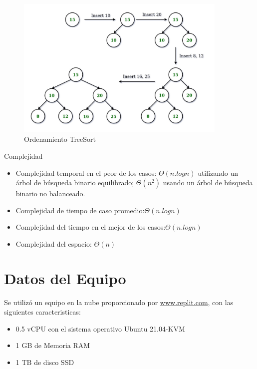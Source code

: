 \documentclass{article}
\begin{document}
\begin{figure}[H]
\centering
\includegraphics[width=0.9\textwidth]{img/treeejem.jpg}
\caption{Ordenamiento TreeSort}
\label{fig:QuickSort}
\end{figure}

\item Complejidad

 \begin{itemize}
          \item Complejidad temporal en el peor de los casos: $\Theta (n.log n)$  utilizando un árbol de búsqueda binario equilibrado; $\Theta (n^2)$ usando un árbol de búsqueda binario no balanceado.
           \item Complejidad de tiempo de caso promedio:$\Theta (n.log n)$
           \item Complejidad del tiempo en el mejor de los casos:$\Theta (n.log n)$
           \item Complejidad del espacio: $\Theta (n)$

\end{itemize}

    
    
    
    \section{Datos del Equipo}
    Se utilizó un equipo en la nube proporcionado por \href{https://replit.com/~}{www.replit.com}, con las siguientes caracteristicas:

    \begin{itemize}
        \item 0.5 vCPU con el sistema operativo Ubuntu 21.04-KVM
        \item 1 GB de Memoria RAM
        \item 1 TB de disco SSD
    \end{itemize}
\end{document}
